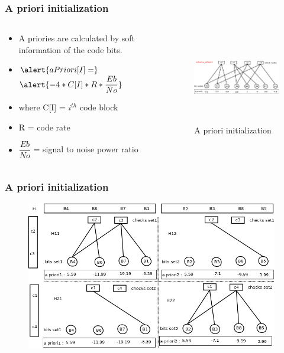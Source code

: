 \documentclass[xcolor=dvipsname]
{beamer}
\begin{document}
\begin{frame}[t]
\frametitle{ A priori initialization }  
\begin{columns}[totalwidth=\textwidth]
	\begin{column}{0.4\textwidth}
	\centering
	\begin{itemize}
	\item A priories are calculated by soft information of the code bits.	
	\item 	$
	\alert{aPriori[I] =}
	$
	$
	\alert{ -4 * C[I] * R * \dfrac{Eb}{No}}
	$ 
	\item where C[I] = $i^{th}$ code block
	\item R = code rate
	\item $\dfrac{Eb}{No}$ = signal to noise power ratio
	\end{itemize}
 
			
	\end{column}%
	   		
	\begin{column}{0.6\textwidth}
	\centering
	\begin{figure}
	\includegraphics[height=4cm,width=7cm]{minSum2}
	\caption{ A priori initialization }
	\end{figure}
	\end{column}%
\end{columns}
\end{frame}


\begin{frame}[t]
\frametitle{ A priori initialization }  
\vspace{-5mm}
\begin{figure}
       \includegraphics[height=6.5cm,width=11cm]{minSumModified1}
       \end{figure}
\end{frame}
\end{document}
